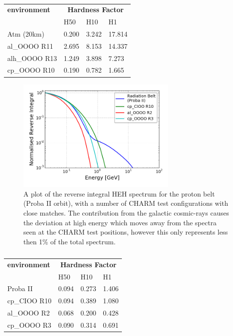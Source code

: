 \begin{table}[htbp]
\centering
\begin{tabular}{l|l|l|l}
\textbf{environment} & \multicolumn{3}{c}{\textbf{Hardness Factor}} \\ \cline{2-4}
				& H50   & H10   & H1 \\
\hline
\hline
\rowcolor{gray!30} Atm (20km) & 0.200 & 3.242 & 17.814 \\
al\_OOOO R11	& 2.695 & 8.153 & 14.337 \\
alh\_OOOO R13	& 1.249 & 3.898 & 7.273 \\
cp\_OOOO R10 	& 0.190 & 0.782 & 1.665 \\
\end{tabular}%
\caption{}
\label{tab:hardness_factor_atm_nyc}%
\end{table}%

\clearpage

\begin{figure}[ht!]
	\centering
	\includegraphics[width=0.7\textwidth]{./images/hardness/space_charm_comparison}
	\caption{A plot of the reverse integral HEH spectrum for the proton belt (Proba II orbit), with a number of CHARM test configurations with close matches. The contribution from the galactic cosmic-rays causes the deviation at high energy which moves away from the spectra seen at the CHARM test positions, however this only represents less then 1\% of the total spectrum.}
	\label{fig:space_charm_comparison}
\end{figure}

\begin{table}[htbp]
\centering
\begin{tabular}{l|l|l|l}
\textbf{environment} & \multicolumn{3}{c}{\textbf{Hardness Factor}} \\ \cline{2-4}
				& H50   & H10   & H1 \\
\hline
\hline
\rowcolor{gray!30} Proba II & 0.094 & 0.273 & 1.406 \\
cp\_CIOO R10	& 0.094 & 0.389 & 1.080 \\
al\_OOOO R2	& 0.068 & 0.200 & 0.428 \\
cp\_OOOO R3 	& 0.090 & 0.314 & 0.691 \\
\end{tabular}%
\caption{}
\label{tab:hardness_factor_proba}%
\end{table}%


